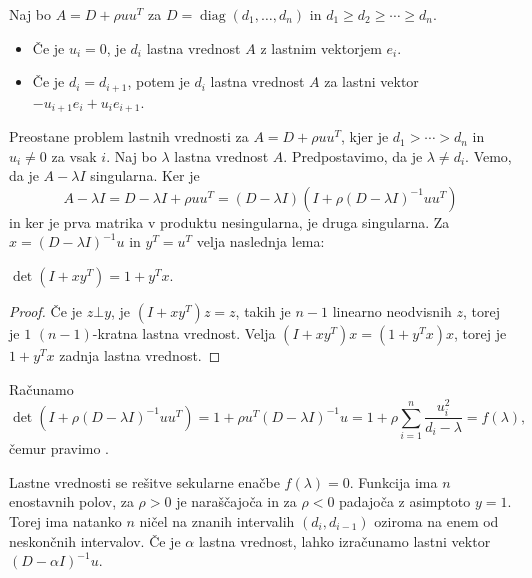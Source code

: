\begin{izrek}
  Naj bo $A = D + \rho u u^T$ za $D = \operatorname{diag}(d_1, \ldots, d_n)$ in
  $d_1 \ge d_2 \ge \cdots \ge d_n$.
  \begin{itemize}
  \item Če je $u_i = 0$, je $d_i$ lastna vrednost $A$ z lastnim vektorjem $e_i$.
  \item Če je $d_i = d_{i+1}$, potem je $d_i$ lastna vrednost $A$ za lastni
	vektor $- u_{i+1} e_i + u_i e_{i+1}$.
  \end{itemize}
\end{izrek}


Preostane problem lastnih vrednosti za $A = D + \rho u u^T$, kjer je $d_1 >
\cdots > d_n$ in $u_i \ne 0$ za vsak $i$.
Naj bo $\lambda$ lastna vrednost $A$.
Predpostavimo, da je $\lambda \ne d_i$.
Vemo, da je $A - \lambda I$ singularna.
Ker je
\[
  A - \lambda I = D - \lambda I + \rho u u^T
  = (D - \lambda I)(I + \rho (D - \lambda I)^{-1} u u^T)
\]
in ker je prva matrika v produktu nesingularna, je druga singularna.
Za $x = (D - \lambda I)^{-1} u$ in $y^T = u^T$ velja naslednja lema:

\begin{lema}
  $\det (I + x y^T) = 1 + y^T x$.
\end{lema}

\begin{proof}
  Če je $z \bot y$, je $(I + xy^T)z = z$, takih je $n-1$ linearno neodvisnih
  $z$, torej je $1$ $(n-1)$-kratna lastna vrednost.
  Velja $(I + xy^T)x = (1 + y^T x)x$, torej je $1 + y^T x$ zadnja lastna
  vrednost.
\end{proof}

Računamo
\[
  \det (I+ \rho (D - \lambda I)^{-1} u u^T) = 1 + \rho u^T (D - \lambda I)^{-1}
  u
  = 1 + \rho \sum_{i=1}^n \frac{u_i^2}{d_i - \lambda} = f(\lambda),
\]
čemur pravimo .


Lastne vrednosti se rešitve sekularne enačbe $f(\lambda) = 0$.
Funkcija ima $n$ enostavnih polov, za $\rho > 0$ je naraščajoča in za $\rho < 0$
padajoča z asimptoto $y = 1$.
Torej ima natanko $n$ ničel na znanih intervalih $(d_i, d_{i-1})$ oziroma na
enem od neskončnih intervalov.
Če je $\alpha$ lastna vrednost, lahko izračunamo lastni vektor $(D - \alpha
I)^{-1} u$.

